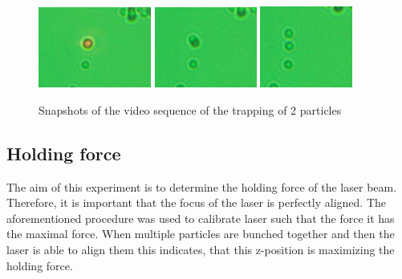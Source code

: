 \documentclass[12pt,english]{scrartcl}
\begin{document}
\begin{figure}[H]
	\centering
	\includegraphics[width=0.33\textwidth]{figures/stacked_1.JPG}
	\includegraphics[width=0.3\textwidth]{figures/stacked_2.JPG}
	\includegraphics[width=0.27\textwidth]{figures/stacked_3.JPG}
	\caption[Snapshots of the video sequence of the trapping of 2 particles]{Snapshots of the video sequence of the trapping of 2 particles
	}\label{fig:stacked}
\end{figure}

\subsection{Holding force}

The aim of this experiment is to determine the holding force of the laser beam.
Therefore, it is important that the focus of the laser is perfectly aligned.
The aforementioned procedure was used to calibrate laser such that the force it
has the maximal force. When multiple particles are bunched together and then
the laser is able to align them this indicates, that this z-position is
maximizing the holding force.
\end{document}
